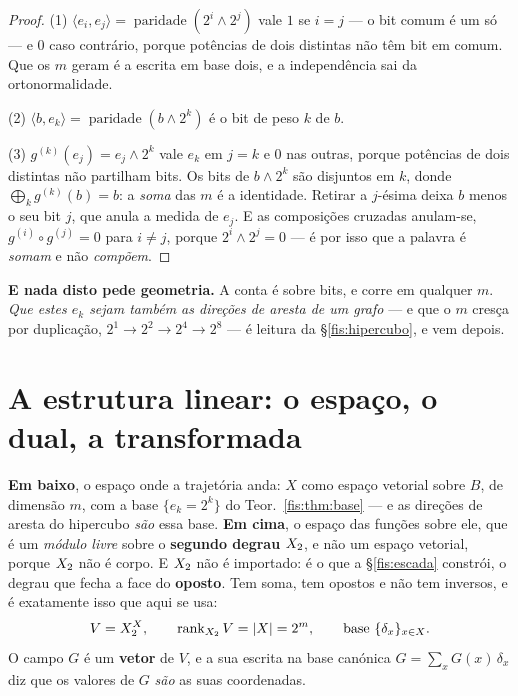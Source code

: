 \documentclass[livro.tex]{subfiles}
\begin{document}
\begin{proof}
(1) $\langle e_i,e_j\rangle=\operatorname{paridade}(2^i\wedge2^j)$ vale $1$ se
$i=j$ --- o bit comum é um só --- e $0$ caso contrário, porque potências de dois
distintas não têm bit em comum. Que os $m$ geram é a escrita em base dois, e a
independência sai da ortonormalidade.

(2) $\langle b,e_k\rangle=\operatorname{paridade}(b\wedge2^k)$ é o bit de peso
$k$ de $b$.

(3) $g^{(k)}(e_j)=e_j\wedge2^{k}$ vale $e_k$ em $j=k$ e $0$ nas outras, porque
potências de dois distintas não partilham bits. Os bits de $b\wedge2^{k}$ são
disjuntos em $k$, donde $\bigoplus_k g^{(k)}(b)=b$: a \emph{soma} das $m$ é a
identidade. Retirar a $j$-ésima deixa $b$ menos o seu bit $j$, que anula a medida
de $e_j$. E as composições cruzadas anulam-se, $g^{(i)}\circ g^{(j)}=0$ para
$i\neq j$, porque $2^i\wedge2^j=0$ --- é por isso que a palavra é \emph{somam} e
não \emph{compõem}.
\end{proof}

\medskip\noindent\textbf{E nada disto pede geometria.} A conta é sobre bits, e
corre em qualquer $m$. \emph{Que estes $e_k$ sejam também as direções de aresta
de um grafo} --- e que o $m$ cresça por duplicação, $2^{1}\to2^{2}\to2^{4}\to2^{8}$
--- é leitura da §\ref{fis:hipercubo}, e vem depois.


\section{A estrutura linear: o espaço, o dual, a transformada}\label{fis:transf}

\begin{definicao}\label{fis:def:doisandares}
\textbf{Em baixo}, o espaço onde a trajetória anda: $X$ como espaço vetorial
sobre $B$, de dimensão $m$, com a base $\{e_k=2^{k}\}$ do
Teor.~\ref{fis:thm:base} --- e as direções de aresta do hipercubo \emph{são} essa
base. \textbf{Em cima}, o espaço das funções sobre ele, que é um \emph{módulo
livre} sobre o \textbf{segundo degrau} $X_2$, e não um espaço vetorial, porque
$X_2$ não é corpo. E $X_2$ não é importado: é o que a §\ref{fis:escada} constrói,
o degrau que fecha a face do \textbf{oposto}. Tem soma, tem opostos e não tem
inversos, e é exatamente isso que aqui se usa:
\[
V=X_2^{X},\qquad \operatorname{rank}_{X_2}V=\lvert X\rvert=2^{m},
\qquad \text{base } \{\delta_x\}_{x\in X}.
\]
O campo $G$ é um \textbf{vetor} de $V$, e a sua escrita na base canónica
$G=\sum_x G(x)\,\delta_x$ diz que os valores de $G$ \emph{são} as suas
coordenadas.
\end{definicao}
\end{document}
